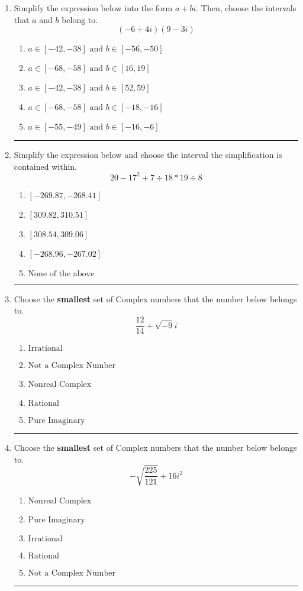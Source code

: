 \documentclass[14pt]{extbook}
\newcommand{\litem}[1]{\item#1\hspace*{-1cm}\rule{\textwidth}{0.4pt}}
\begin{document}
\begin{enumerate}
\litem{
Simplify the expression below into the form $a+bi$. Then, choose the intervals that $a$ and $b$ belong to.\[ (-6 + 4 i)(9 - 3 i) \]\begin{enumerate}[label=\Alph*.]
\item \( a \in [-42, -38] \text{ and } b \in [-56, -50] \)
\item \( a \in [-68, -58] \text{ and } b \in [16, 19] \)
\item \( a \in [-42, -38] \text{ and } b \in [52, 59] \)
\item \( a \in [-68, -58] \text{ and } b \in [-18, -16] \)
\item \( a \in [-55, -49] \text{ and } b \in [-16, -6] \)

\end{enumerate} }
\litem{
Simplify the expression below and choose the interval the simplification is contained within.\[ 20 - 17^2 + 7 \div 18 * 19 \div 8 \]\begin{enumerate}[label=\Alph*.]
\item \( [-269.87, -268.41] \)
\item \( [309.82, 310.51] \)
\item \( [308.54, 309.06] \)
\item \( [-268.96, -267.02] \)
\item \( \text{None of the above} \)

\end{enumerate} }
\litem{
Choose the \textbf{smallest} set of Complex numbers that the number below belongs to.\[ \frac{12}{14}+\sqrt{-9}i \]\begin{enumerate}[label=\Alph*.]
\item \( \text{Irrational} \)
\item \( \text{Not a Complex Number} \)
\item \( \text{Nonreal Complex} \)
\item \( \text{Rational} \)
\item \( \text{Pure Imaginary} \)

\end{enumerate} }
\litem{
Choose the \textbf{smallest} set of Complex numbers that the number below belongs to.\[ -\sqrt{\frac{225}{121}} + 16i^2 \]\begin{enumerate}[label=\Alph*.]
\item \( \text{Nonreal Complex} \)
\item \( \text{Pure Imaginary} \)
\item \( \text{Irrational} \)
\item \( \text{Rational} \)
\item \( \text{Not a Complex Number} \)


\end{enumerate}}
\end{enumerate}
\end{document}
